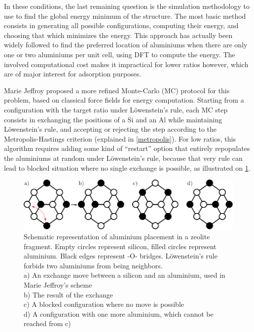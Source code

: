 \documentclass[main.tex]{subfiles}
\begin{document}
In these conditions, the last remaining question is the simulation methodology to use to find the global energy minimum of the structure. The most basic method consists in generating all possible configurations, computing their energy, and choosing that which minimizes the energy. This approach has actually been widely followed to find the preferred location of aluminiums when there are only one or two aluminiums per unit cell, using DFT to compute the energy\autocite{AlDistributionThermodynamic,AlDistributionFAUDFT}. The involved computational cost makes it impractical for lower \SiAl ratios however, which are of major interest for adsorption purposes.

Marie Jeffroy \cite{Jeffroy}\label{mariejeffroy_al} proposed a more refined Monte-Carlo (MC) protocol for this problem, based on classical force fields for energy computation. Starting from a configuration with the target \SiAl ratio under L\"owenstein's rule, each MC step consists in exchanging the positions of a Si and an Al while maintaining L\"owenstein's rule, and accepting or rejecting the step according to the Metropolis-Hastings criterion (explained in \cref{metropolis}). For low \SiAl ratios, this algorithm requires adding some kind of ``restart'' option that entirely repopulates the aluminiums at random under L\"owenstein's rule, because that very rule can lead to blocked situation where no single \SiAl exchange is possible, as illustrated on \cref{fig:blocked_situation}.

\begin{figure}
	\centering
	\includegraphics[width=\columnwidth]{figures/cations/blocked_situation.pdf}
	\caption{Schematic representation of aluminium placement in a zeolite fragment. Empty circles represent silicon, filled circles represent aluminium. Black edges represent -O- bridges. L\"owenstein's rule forbids two aluminiums from being neighbors.\\a) An exchange move between a silicon and an aluminium, used in Marie Jeffroy's scheme\autocite{Jeffroy}\\b) The result of the exchange\\c) A blocked configuration where no move is possible\\d) A configuration with one more aluminium, which cannot be reached from c)}\label{fig:blocked_situation}
\end{figure}
\end{document}
